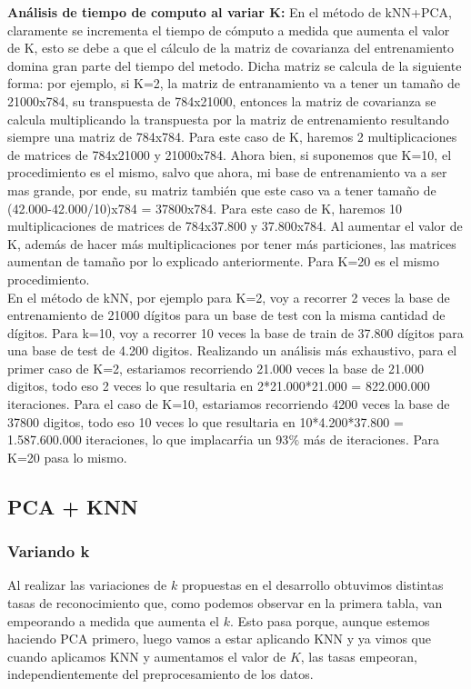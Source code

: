 \textbf{Análisis de tiempo de computo al variar K:}
 En el método de kNN+PCA, claramente se incrementa el tiempo de cómputo a medida que aumenta el valor de K, esto se debe a que el cálculo de la matriz de covarianza del entrenamiento domina gran parte del tiempo del metodo. Dicha matriz se calcula de la siguiente forma: por ejemplo, si K=2, la matriz de entranamiento va a tener un tamaño de 21000x784, su transpuesta de 784x21000, entonces la matriz de covarianza se calcula multiplicando la transpuesta por la matriz de entrenamiento resultando siempre una matriz de 784x784. Para este caso de K, haremos 2 multiplicaciones de matrices de 784x21000 y 21000x784. Ahora bien, si suponemos que K=10, el procedimiento es el mismo, salvo que ahora, mi base de entrenamiento va a ser mas grande, por ende, su matriz también que este caso va a tener tamaño de (42.000-42.000/10)x784 = 37800x784. Para este caso de K, haremos 10 multiplicaciones de matrices de 784x37.800 y 37.800x784. Al aumentar el valor de K, además de hacer más multiplicaciones por tener más particiones, las matrices aumentan de tamaño por lo explicado anteriormente. Para K=20 es el mismo procedimiento.\\
En el método de kNN, por ejemplo para K=2, voy a recorrer 2 veces la base de entrenamiento de 21000 dígitos para un base de test con la misma cantidad de dígitos. Para k=10, voy a recorrer 10 veces la base de train de 37.800 dígitos para una base de test de 4.200 digitos. Realizando un análisis más exhaustivo, para el primer caso de K=2, estariamos recorriendo 21.000 veces la base de 21.000 digitos, todo eso 2 veces lo que resultaria en 2*21.000*21.000 = 822.000.000 iteraciones. Para el caso de K=10, estariamos recorriendo 4200 veces la base de 37800 digitos, todo eso 10 veces lo que resultaria en 10*4.200*37.800 = 1.587.600.000 iteraciones, lo que implacarŕia un 93$\%$ más de iteraciones. Para K=20 pasa lo mismo.\\

\subsection{PCA + KNN}
\subsubsection{Variando k}
Al realizar las variaciones de $k$ propuestas en el desarrollo obtuvimos distintas tasas de reconocimiento que, como podemos observar en la primera tabla, van empeorando a medida que aumenta el $k$. Esto pasa porque, aunque estemos haciendo PCA primero, luego vamos a estar aplicando KNN y ya vimos que cuando aplicamos KNN y aumentamos el valor de $K$, las tasas empeoran, independientemente del preprocesamiento de los datos.
